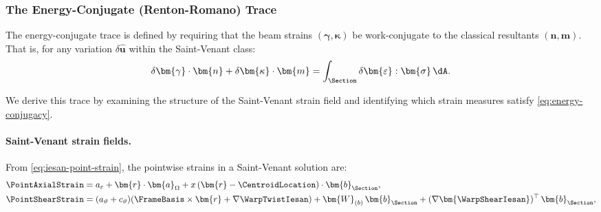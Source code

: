 
\subsubsection{The Energy-Conjugate (Renton-Romano) Trace}

The energy-conjugate trace is defined by requiring that the beam strains 
$(\bm{\gamma}, \bm{\kappa})$ be work-conjugate to the classical resultants 
$(\bm{n}, \bm{m})$. That is, for any variation $\delta\hat{\bm{u}}$ within the 
Saint-Venant class:
\begin{equation}
\delta\bm{\gamma} \cdot \bm{n} + \delta\bm{\kappa} \cdot \bm{m} 
= \int_\Section \delta\bm{\varepsilon} : \bm{\sigma} \, \dA.
\label{eq:energy-conjugacy}
\end{equation}

We derive this trace by examining the structure of the Saint-Venant strain 
field and identifying which strain measures satisfy \eqref{eq:energy-conjugacy}.

\paragraph{Saint-Venant strain fields.}

From \eqref{eq:iesan-point-strain}, the pointwise strains in a Saint-Venant 
solution are:
\begin{align}
\PointAxialStrain &= a_\varepsilon + \bm{r} \cdot \bm{a}_\Omega 
+ x\,(\bm{r} - \CentroidLocation) \cdot \bm{b}_{\Section}, 
\label{eq:sv-axial-strain} \\
\PointShearStrain &= (a_\vartheta + c_\vartheta)(\FrameBasis \times \bm{r} + \nabla\WarpTwistIesan) 
+ \bm{W}_{(b)}\,\bm{b}_{\Section} + (\nabla\bm{\WarpShearIesan})^\top\,\bm{b}_{\Section},
\label{eq:sv-shear-strain}
\end{align}

